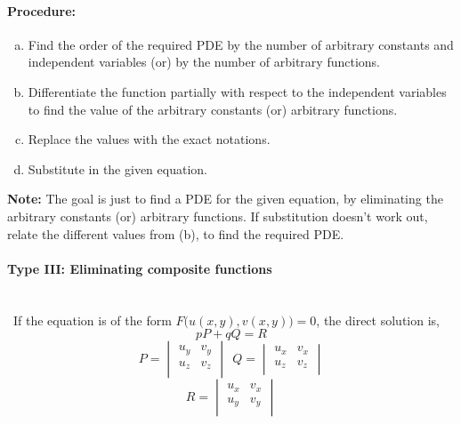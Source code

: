 \documentclass{article}
\newcommand{\para}[1]{\paragraph{#1}\mbox{}\\}
\begin{document}
{\paragraph{\Large Procedure:}
\begin{enumerate}[(a)]
\item Find the order of the required PDE by the number of arbitrary constants and independent variables (or) by the number of arbitrary functions.
\item Differentiate the function partially with respect to the independent variables to find the value of the arbitrary constants (or) arbitrary functions.
\item Replace the values with the exact notations.
\item Substitute in the given equation.
\newline
\end{enumerate}
\textbf{Note:} The goal is just to find a PDE for the given equation, by eliminating the arbitrary constants (or) arbitrary functions. If substitution doesn't work out, relate the different values from (b), to find the required PDE.
\newpage
\para{\Large Type III: Eliminating composite functions}
\
If the equation is of the form {\LARGE $F\big(u(x,y),v(x,y)\big)=0$}, the direct solution is,
{\LARGE $$pP+qQ=R$$
$$P=\begin{vmatrix}
u_y & v_y  \\
u_z & v_z  \\
\end{vmatrix}\ \ 
Q=\begin{vmatrix}
u_x & v_x  \\
u_z & v_z  \\
\end{vmatrix}$$
$$R=\begin{vmatrix}
u_x & v_x  \\
u_y & v_y  \\
\end{vmatrix}$$}
\newline
}
\end{document}
